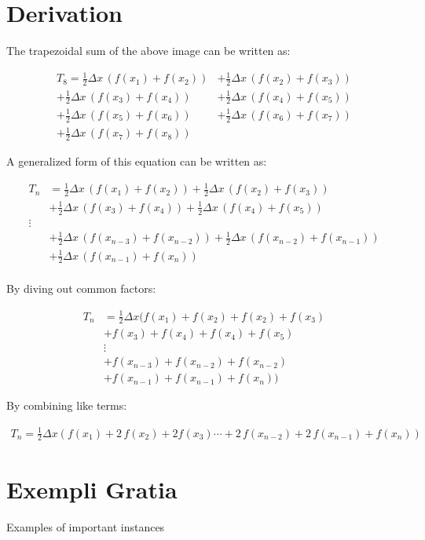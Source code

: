 \documentclass{article}
\begin{document}
\section{Derivation}

\noindent The trapezoidal sum of the above image can be written as:

\begin{align*}
T_8=\frac{1}{2}\Delta x \, (f(x_1)+f(x_2)) &+ \frac{1}{2}\Delta x \, (f(x_2)+f(x_3))\\
   +\frac{1}{2}\Delta x \, (f(x_3)+f(x_4)) &+ \frac{1}{2}\Delta x \, (f(x_4)+f(x_5))\\
   +\frac{1}{2}\Delta x \, (f(x_5)+f(x_6)) &+ \frac{1}{2}\Delta x \, (f(x_6)+f(x_7))\\
   +\frac{1}{2}\Delta x \, (f(x_7)+f(x_8))
\end{align*}

\noindent A generalized form of this equation can be written as:

\begin{align*}
T_n&=\frac{1}{2}\Delta x \, (f(x_1)+f(x_2)) + \frac{1}{2}\Delta x \, (f(x_2)+f(x_3))\\
   &+\frac{1}{2}\Delta x \, (f(x_3)+f(x_4)) + \frac{1}{2}\Delta x \, (f(x_4)+f(x_5))\\
   \vdots\\
   &+\frac{1}{2}\Delta x \, (f(x_{n-3})+f(x_{n-2})) + \frac{1}{2}\Delta x \, (f(x_{n-2})+f(x_{n-1}))\\
   &+\frac{1}{2}\Delta x \, (f(x_{n-1})+f(x_n))\\
\end{align*}

\noindent By diving out common factors:

\begin{align*}
T_n&=\frac{1}{2}\Delta x (f(x_1) + f(x_2) + f(x_2) + f(x_3)\\
					   &+ f(x_3) + f(x_4) + f(x_4) + f(x_5)\\
					   &\vdots\\
					   &+ f(x_{n-3}) + f(x_{n-2}) + f(x_{n-2})\\
					   &+ f(x_{n-1}) + f(x_{n-1}) + f(x_{n}))
\end{align*}

\noindent By combining like terms:

\begin{align*}
T_n=\frac{1}{2}\Delta x(f(x_1)+2\,f(x_2)+2f(x_3)\cdots+2\,f(x_{n-2})+2\,f(x_{n-1})+f(x_n))
\end{align*}

\section{Exempli Gratia}

Examples of important instances
\end{document}
